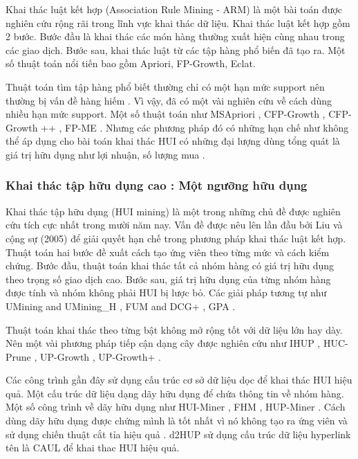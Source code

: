 Khai thác luật kết hợp (Association Rule Mining - ARM) là một bài toán được nghiên cứu rộng rãi trong lĩnh vực khai thác dữ liệu. Khai thác luật kết hợp gồm 2 bước. Bước đầu là khai thác các món hàng thường xuất hiện cùng nhau trong các giao dịch. Bước sau, khai thác luật từ các tập hàng phổ biến đã tạo ra. Một số thuật toán nổi tiến bao gồm Apriori\cite{agrawal1994fast}, FP-Growth\cite{han2000mining}, Eclat\cite{zaki2000scalable}. 

Thuật toán tìm tập hàng phổ biết thường chỉ có một hạn mức support nên thường bị vấn đề hàng hiếm \cite{liu1999mining}. Vì vậy, đã có một vài nghiên cứu về cách dùng nhiều hạn mức support. Một số thuật toán như MSApriori \cite{liu1999mining}, CFP-Growth \cite{hu2006mining}, CFP-Growth ++ \cite{kiran2011novel}, FP-ME \cite{gan2017mining}. Nhưng các phương pháp đó có những hạn chế như không thể áp dụng cho bài toán khai thác HUI có những đại lượng dùng tổng quát là giá trị hữu dụng như lợi nhuận, số lượng mua \cite{lin2016efficient}. 

\subsubsection{Khai thác tập hữu dụng cao : Một ngưỡng hữu dụng}

Khai thác tập hữu dụng (HUI mining) là một trong những chủ đề được nghiên cứu tích cực nhất trong mười năm nay. Vấn đề được nêu lên lần đầu bởi Liu và cộng sự (2005) để giải quyết hạn chế trong phương pháp khai thác luật kết hợp. Thuật toán hai bước \cite{liu2005two} đề xuất cách tạo ứng viên theo từng mức và cách kiểm chứng. Bước đầu, thuật toán khai thác tất cả nhóm hàng có giá trị hữu dụng theo trọng số giao dịch cao. Bước sau, giá trị hữu dụng của từng nhóm hàng được tính và nhóm không phải HUI bị lược bỏ. Các giải pháp tương tự như UMining and UMining\_H \cite{yao2006mining}, FUM and DCG+ \cite{li2008isolated}, GPA \cite{lan2012efficient}.

Thuật toán khai thác theo từng bật không mở rộng tốt với dữ liệu lớn hay dày. Nên một vài phương pháp tiếp cận dạng cây được nghiên cứu như IHUP \cite{ahmed2009efficient}, HUC-Prune \cite{ahmed2011huc}, UP-Growth \cite{tseng2010up}, UP-Growth+ \cite{tseng2013efficient}.

Các công trình gần đây sử dụng cấu trúc cơ sở dữ liệu dọc để khai thác HUI hiệu quả. Một cấu trúc dữ liệu dạng dãy hữu dụng để chứa thông tin về nhóm hàng. Một số công trình về dãy hữu dụng như HUI-Miner \cite{liu2012mining}, FHM \cite{fournier2014fhm}, HUP-Miner \cite{krishnamoorthy2015pruning}. Cách dùng dãy hữu dụng được chứng mình là tốt nhất vì nó không tạo ra ứng viên và sử dụng chiến thuật cắt tỉa hiệu quả \cite{fournier2014fhm} \cite{liu2012mining}. d2HUP \cite{liu2012mining} sử dụng cấu trúc dữ liệu hyperlink tên là CAUL để khai thac HUI hiệu quả.


